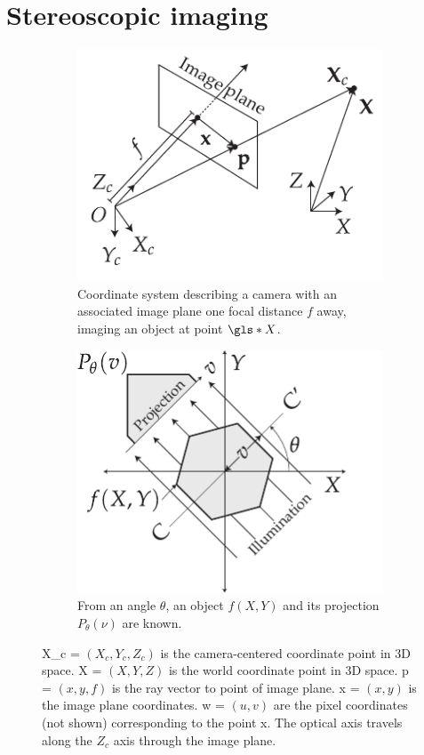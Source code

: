 \documentclass[times, twoside, watermark]{zHenriquesLab-StyleBioRxiv}
\begin{document}
\section*{Stereoscopic imaging}

\begin{figure}
    \centering
    \begin{subfigure}[t]{0.48\linewidth}
        \centering
        \includegraphics{./figures/coordinate_system}
        \caption[Coordinate system]{Coordinate system describing a camera with an associated image plane one focal distance \(f\) away, imaging an object at point \(\gls*{X}\).
        }\label{fig:coordinate_system_flopt}
    \end{subfigure}\hfill
    \begin{subfigure}[t]{0.48\linewidth}
      \centering
      \includegraphics{./figures/OPT_digram}
      \caption[Principle of OPT]{From an angle \(\theta \), an object \(f(X,Y)\) and its projection \(P_\theta(\nu)\) are known.}\label{fig:OPT_digram}
    \end{subfigure}
    \caption[Coordinates and \gls*{OPT}]{\gls*{X_c} = \((X_c,Y_c,Z_c)\) is the camera-centered coordinate point in 3D space.
            \gls*{X} = \((X,Y,Z)\) is the world coordinate point in 3D space.
            \gls*{p} = \((x,y,f)\) is the ray vector to point of image plane.
            \gls*{x} = \((x,y)\) is the image plane coordinates.
            \gls*{w} = \((u,v)\) are the pixel coordinates (not shown) corresponding to the point \gls*{x}.
            The optical axis travels along the \(Z_c\) axis through the image plane.}
\end{figure}
\end{document}
